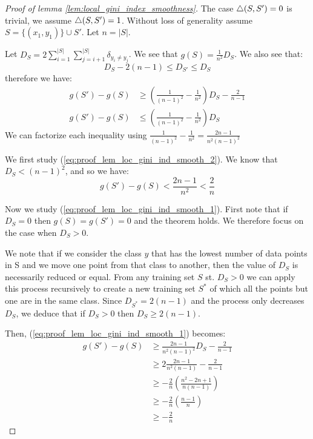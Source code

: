 \begin{proof}[Proof of lemma \ref{lem:local_gini_index_smoothness}]
    The case $\triangle(S, S') = 0$ is trivial, we assume $\triangle(S, S') = 1$. Without loss of generality assume $S = \{(x_1, y_1)\} \cup S'$. Let $n = |S|$.
    
    Let $D_S = 2\sum_{i=1}^{|S|}\sum_{j=i+1}^{|S|} \delta_{y_i \neq y_j}$. We see that $g(S) = \frac{1}{n^2}D_S$. We also see that:
    \begin{equation*}
        D_S - 2(n-1) \leq D_{S'} \leq D_S
    \end{equation*}
    therefore we have:
    \begin{align}
        g(S') - g(S) &\geq \left(\frac{1}{(n-1)^2} - \frac{1}{n^2}\right)D_S - \frac{2}{n-1}\label{eq:proof_lem_loc_gini_ind_smooth_1}\\
        g(S') - g(S) &\leq \left(\frac{1}{(n-1)^2} - \frac{1}{n^2}\right)D_S\label{eq:proof_lem_loc_gini_ind_smooth_2}
    \end{align}
    We can factorize each inequality using $\frac{1}{(n-1)^2} - \frac{1}{n^2} = \frac{2n-1}{n^2(n-1)^2}$

    We first study (\ref{eq:proof_lem_loc_gini_ind_smooth_2}). We know that $D_S < (n-1)^2$, and so we have:
    \begin{equation*}
        g(S') - g(S) < \frac{2n-1}{n^2} < \frac{2}{n}
    \end{equation*}

    Now we study (\ref{eq:proof_lem_loc_gini_ind_smooth_1}). First note that if $D_S = 0$ then $g(S) = g(S') = 0$ and the theorem holds. We therefore focus on the case when $D_S > 0$.

    We note that if we consider the class $y$ that has the lowest number of data points in S and we move one point from that class to another, then the value of $D_S$ is necessarily reduced or equal. From any training set $S$ st. $D_S > 0$ we can apply this process recursively to create a new training set $S^*$ of which all the points but one are in the same class. Since $D_{S^*} = 2(n-1)$ and the process only decreases $D_S$, we deduce that if $D_S > 0$ then $D_S \geq 2(n-1)$.

    Then, (\ref{eq:proof_lem_loc_gini_ind_smooth_1}) becomes:
    \begin{equation*}
        \begin{split}
            g(S') - g(S) &\geq \frac{2n-1}{n^2(n-1)^2} D_S - \frac{2}{n-1}\\
            &\geq 2\frac{2n-1}{n^2(n-1)} - \frac{2}{n-1}\\
            &\geq -\frac{2}{n}\left(\frac{n^2 - 2n + 1}{n (n-1)}\right)\\
            &\geq -\frac{2}{n}\left(\frac{n-1}{n}\right)\\
            &\geq -\frac{2}{n}
        \end{split}
    \end{equation*}
\end{proof}

